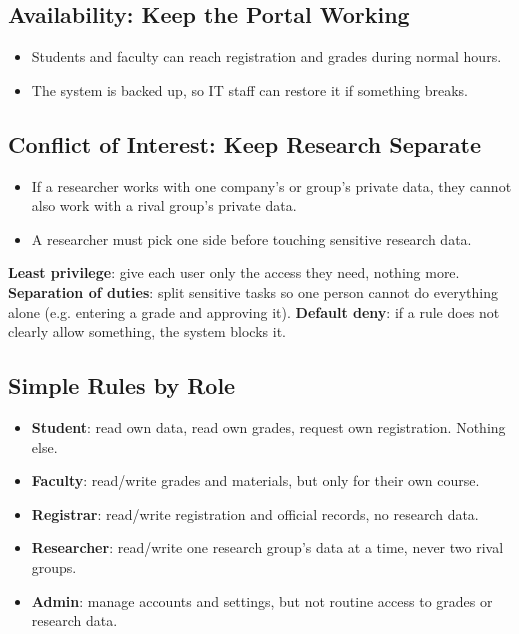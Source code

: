        \subsection[Availability]{Availability: Keep the Portal Working}

            \begin{itemize}
                \item Students and faculty can reach registration and grades during normal hours.
                \item The system is backed up, so IT staff can restore it if something breaks.
            \end{itemize}

        \subsection[ConflictOfInterest]{Conflict of Interest: Keep Research Separate}

            \begin{itemize}
                \item If a researcher works with one company's or group's private data, they cannot also work
                    with a rival group's private data.
                \item A researcher must pick one side before touching sensitive research data.
            \end{itemize}

    \pagebreak

            \begin{defbox}
                \textbf{Least privilege}: give each user only the access they need, nothing more.
                \textbf{Separation of duties}: split sensitive tasks so one person cannot do everything alone
                (e.g. entering a grade and approving it).
                \textbf{Default deny}: if a rule does not clearly allow something, the system blocks it.
            \end{defbox}

        \subsection[Rules]{Simple Rules by Role}

            \begin{itemize}
                \item \textbf{Student}: read own data, read own grades, request own registration. Nothing else.
                \item \textbf{Faculty}: read/write grades and materials, but only for their own course.
                \item \textbf{Registrar}: read/write registration and official records, no research data.
                \item \textbf{Researcher}: read/write one research group's data at a time, never two rival
                    groups.
                \item \textbf{Admin}: manage accounts and settings, but not routine access to grades or research
                    data.
            \end{itemize}

